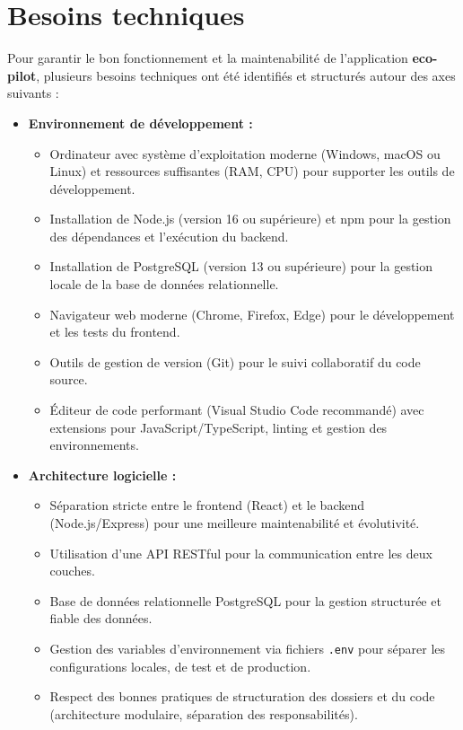 \documentclass[12pt,a4paper]{report}
\begin{document}
\section{Besoins techniques}

Pour garantir le bon fonctionnement et la maintenabilité de l’application \textbf{eco-pilot}, plusieurs besoins techniques ont été identifiés et structurés autour des axes suivants :

\begin{itemize}
    \item \textbf{Environnement de développement :}
    \begin{itemize}
        \item Ordinateur avec système d’exploitation moderne (Windows, macOS ou Linux) et ressources suffisantes (RAM, CPU) pour supporter les outils de développement.
        \item Installation de Node.js (version 16 ou supérieure) et npm pour la gestion des dépendances et l’exécution du backend.
        \item Installation de PostgreSQL (version 13 ou supérieure) pour la gestion locale de la base de données relationnelle.
        \item Navigateur web moderne (Chrome, Firefox, Edge) pour le développement et les tests du frontend.
        \item Outils de gestion de version (Git) pour le suivi collaboratif du code source.
        \item Éditeur de code performant (Visual Studio Code recommandé) avec extensions pour JavaScript/TypeScript, linting et gestion des environnements.
    \end{itemize}
    \item \textbf{Architecture logicielle :}
    \begin{itemize}
        \item Séparation stricte entre le frontend (React) et le backend (Node.js/Express) pour une meilleure maintenabilité et évolutivité.
        \item Utilisation d’une API RESTful pour la communication entre les deux couches.
        \item Base de données relationnelle PostgreSQL pour la gestion structurée et fiable des données.
        \item Gestion des variables d’environnement via fichiers \texttt{.env} pour séparer les configurations locales, de test et de production.
        \item Respect des bonnes pratiques de structuration des dossiers et du code (architecture modulaire, séparation des responsabilités).

\end{itemize}
\end{itemize}
\end{document}
